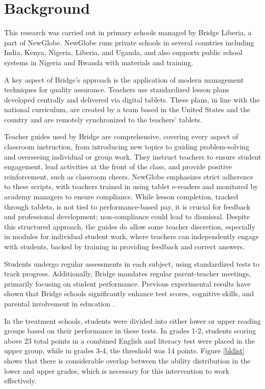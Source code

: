 \documentclass[12pt]{article}
\begin{document}
\section{Background}
\label{sec:back}
This research was carried out in primary schools managed by Bridge Liberia, a part of NewGlobe. NewGlobe runs private schools in several countries including India, Kenya, Nigeria, Liberia, and Uganda, and also supports public school systems in Nigeria and Rwanda with materials and training. 

A key aspect of Bridge's approach is the application of modern management techniques for quality assurance. Teachers use standardized lesson plans developed centrally and delivered via digital tablets. These plans, in line with the national curriculum, are created by a team based in the United States and the country  and are remotely synchronized to the teachers' tablets.

Teacher guides used by Bridge are comprehensive, covering every aspect of classroom instruction, from introducing new topics to guiding problem-solving and overseeing individual or group work. They instruct teachers to ensure student engagement, lead activities at the front of the class, and provide positive reinforcement, such as classroom cheers. NewGlobe emphasizes strict adherence to these scripts, with teachers trained in using tablet e-readers and monitored by academy managers to ensure compliance. While lesson completion, tracked through tablets, is not tied to performance-based pay, it is crucial for feedback and professional development; non-compliance could lead to dismissal. Despite this structured approach, the guides do allow some teacher discretion, especially in modules for individual student work, where teachers can independently engage with students, backed by training in providing feedback and correct answers.

Students undergo regular assessments in each subject, using standardized tests to track progress. Additionally, Bridge mandates regular parent-teacher meetings, primarily focusing on student performance. Previous experimental results have shown that Bridge schools significantly enhance test scores, cognitive skills, and parental involvement in education \citep{gray2022can, romero2020outsourcing}.

In the treatment schools, students were divided into either lower or upper reading groups based on their performance in these tests. In grades 1-2, students scoring above 23 total points in a combined English and literacy test were placed in the upper group, while in grades 3-4, the threshold was 14 points. Figure \ref{bldist} shows that there is considerable overlap between the ability distribution in the lower and upper grades, which is necessary for this intervention to work effectively. 
\end{document}
